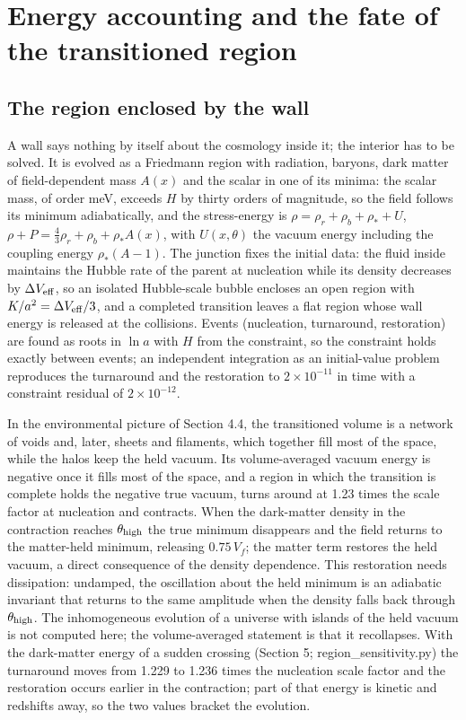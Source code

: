 \documentclass[preprint,12pt]{elsarticle}
\begin{document}
\section{Energy accounting and the fate of the transitioned region}
\subsection{The region enclosed by the wall}
A wall says nothing by itself about the cosmology inside it; the interior has to be solved. It is evolved as a Friedmann region with radiation, baryons, dark matter of field-dependent mass $A(x)$ and the scalar in one of its minima: the scalar mass, of order meV, exceeds $H$ by thirty orders of magnitude, so the field follows its minimum adiabatically, and the stress-energy is $\rho=\rho_r+\rho_b+\rho_*+U$, $\rho+P=\frac43\rho_r+\rho_b+\rho_*A(x)$, with $U(x,\theta)$ the vacuum energy including the coupling energy $\rho_*(A-1)$. The junction fixes the initial data: the fluid inside maintains the Hubble rate of the parent at nucleation while its density decreases by $\Delta V_{\rm eff}$, so an isolated Hubble-scale bubble encloses an open region with $K/a^2=\Delta V_{\rm eff}/3$, and a completed transition leaves a flat region whose wall energy is released at the collisions. Events (nucleation, turnaround, restoration) are found as roots in $\ln a$ with $H$ from the constraint, so the constraint holds exactly between events; an independent integration as an initial-value problem reproduces the turnaround and the restoration to $2\times10^{-11}$ in time with a constraint residual of $2\times10^{-12}$.

In the environmental picture of Section 4.4, the transitioned volume is a network of voids and, later, sheets and filaments, which together fill most of the space, while the halos keep the held vacuum. Its volume-averaged vacuum energy is negative once it fills most of the space, and a region in which the transition is complete holds the negative true vacuum, turns around at 1.23 times the scale factor at nucleation and contracts. When the dark-matter density in the contraction reaches $\theta_{\rm high}$ the true minimum disappears and the field returns to the matter-held minimum, releasing $0.75\,V_f$; the matter term restores the held vacuum, a direct consequence of the density dependence. This restoration needs dissipation: undamped, the oscillation about the held minimum is an adiabatic invariant that returns to the same amplitude when the density falls back through $\theta_{\rm high}$. The inhomogeneous evolution of a universe with islands of the held vacuum is not computed here; the volume-averaged statement is that it recollapses. With the dark-matter energy of a sudden crossing (Section 5; region\_sensitivity.py) the turnaround moves from 1.229 to 1.236 times the nucleation scale factor and the restoration occurs earlier in the contraction; part of that energy is kinetic and redshifts away, so the two values bracket the evolution.
\end{document}
